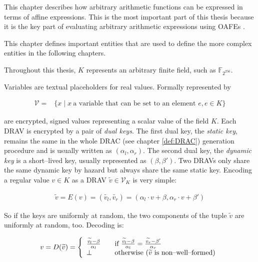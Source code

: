 \label{sec:methods}

This chapter describes how arbitrary arithmetic functions can be expressed in
terms of affine expressions. This is the most important part of this thesis
because it is the key part of evaluating arbitrary arithmetic expressions
using OAFEs \cite{davidgoliath}.


%
%
\label{sec:rae-definitions}

This chapter defines important entities that are used to define the more complex
entities in the following chapters.


\label{def:field} Throughout this thesis, $K$ represents an arbitrary finite
field, such as $\mathbb{F}_{2^{256}}$.



\label{def:variable} Variables are textual placeholders for real values.
Formally represented by

\begin{align*}
  \mathcal{V} = & \{ x \mid x~\text{a variable that can be set to an element
  $e$}, e \in K \}
\end{align*}


%
%
\label{sec:drav}

 are encrypted, signed values
representing a scalar value of the field $K$. Each DRAV is encrypted by a pair
of \emph{dual keys}. The first dual key, the \emph{static key}, remains the same
in the whole DRAC (see chapter \ref{def:DRAC}) generation procedure and is
usually written as $(\alpha_l, \alpha_r)$. The second dual key, the
\emph{dynamic key} is a short--lived key, usually represented as $(\beta,
\beta')$. Two DRAVs only share the same dynamic key by hazard but always share
the same static key. Encoding a regular value $v \in K$ as a DRAV
$\widetilde{v} \in \mathcal{V}_K$ is very simple:

\begin{align*}
  \widetilde{v} = E(v) = (\widetilde{v_l}, \widetilde{v_r}) =
    (\alpha_l \cdot v + \beta, \alpha_r \cdot v + \beta')
\end{align*}

So if the keys are uniformly at random, the two components of the tuple
$\widetilde{v}$ are uniformly at random, too. Decoding is:

\begin{align*}
  v = D(\widetilde{v}) =
  \left\{
    \begin{array}{l l}
      \frac{\widetilde{v_l} - \beta}{\alpha_l} & \quad
      \text{if}~\frac{\widetilde{v_l} - \beta}{\alpha_l} =
      \frac{\widetilde{v_r} - \beta'}{\alpha_r}\\
      \perp & \quad \text{otherwise ($\widetilde{v}$ is non--well--formed)}\\
    \end{array}\right.
\end{align*}

